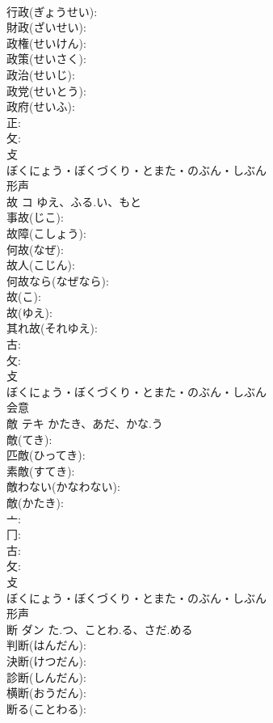 \documentclass[8pt]{extreport}
\begin{document}
\begin{CJK}{UTF8}{min}
\\	行政(ぎょうせい): 
\\	財政(ざいせい): 
\\	政権(せいけん): 
\\	政策(せいさく): 
\\	政治(せいじ): 
\\	政党(せいとう): 
\\	政府(せいふ): 
\\	正: 
\\	攵: 
\\	攴	
\\	ぼくにょう・ぼくづくり・とまた・のぶん・しぶん	
\\	形声 
\\	故	コ	ゆえ、ふる.い、もと		
\\	事故(じこ): 
\\	故障(こしょう): 
\\	何故(なぜ): 
\\	故人(こじん): 
\\	何故なら(なぜなら): 
\\	故(こ): 
\\	故(ゆえ): 
\\	其れ故(それゆえ): 
\\	古: 
\\	攵: 
\\	攴	
\\	ぼくにょう・ぼくづくり・とまた・のぶん・しぶん	
\\	会意 
\\	敵	テキ	かたき、あだ、かな.う		
\\	敵(てき): 
\\	匹敵(ひってき): 
\\	素敵(すてき): 
\\	敵わない(かなわない): 
\\	敵(かたき): 
\\	亠: 
\\	冂: 
\\	古: 
\\	攵: 
\\	攴	
\\	ぼくにょう・ぼくづくり・とまた・のぶん・しぶん	
\\	形声 
\\	断	ダン	た.つ、ことわ.る、さだ.める		
\\	判断(はんだん): 
\\	決断(けつだん): 
\\	診断(しんだん): 
\\	横断(おうだん): 
\\	断る(ことわる): 

\end{CJK}
\end{document}
